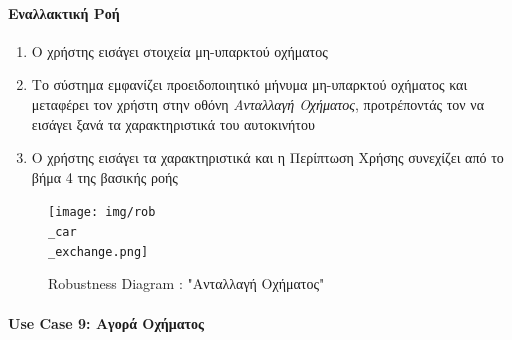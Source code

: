 \documentclass{../ol-softwaremanual}
\begin{document}
	\paragraph{{Εναλλακτική Ροή}}
	
	\begin{enumerate}
		\item Ο χρήστης εισάγει στοιχεία μη-υπαρκτού οχήματος
		\item Το σύστημα εμφανίζει προειδοποιητικό μήνυμα μη-υπαρκτού οχήματος και μεταφέρει τον χρήστη στην οθόνη \textit{Ανταλλαγή Οχήματος}, προτρέποντάς τον να εισάγει ξανά τα χαρακτηριστικά του αυτοκινήτου
		\item Ο χρήστης εισάγει τα χαρακτηριστικά και η Περίπτωση Χρήσης συνεχίζει από το βήμα 4 της βασικής ροής
	\end{enumerate}
	
	\newpage
	
	\begin{figure}[htbp!]
		\texttt{[image: img/rob\\\_car\\\_exchange.png]}
		\caption{\en Robustness Diagram : "\gr Ανταλλαγή Οχήματος\en"\gr\protect\footnotemark[3]}
	\end{figure}
	
	
	
	
	
	\newpage
	\centering
	
	\paragraph{\en Use Case 9: \gr Αγορά Οχήματος\gr}
	
\end{document}
